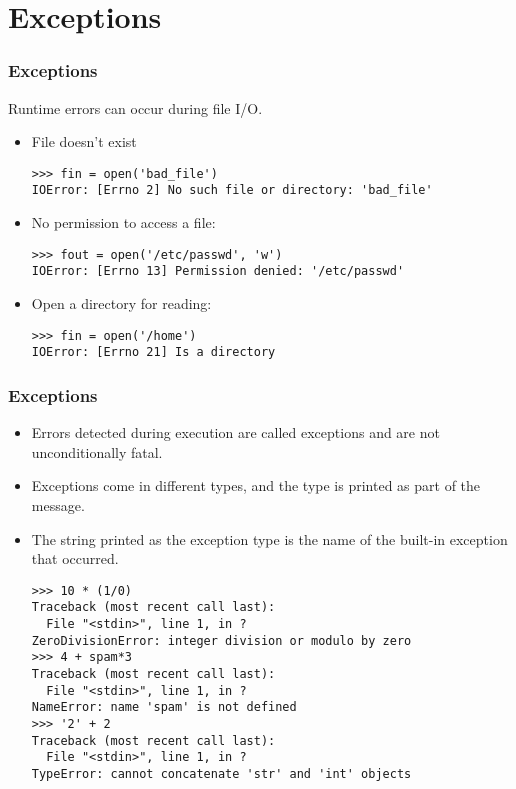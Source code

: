 \documentclass[handout]{beamer}
\newcommand{\beforeverb}{\footnotesize}
\newcommand{\afterverb}{\normalsize}
\begin{document}
\section[Exceptions]{Exceptions}
\begin{frame}[fragile]
\frametitle{Exceptions}
 \alert{Runtime errors} can occur during file I/O.
\begin{itemize}
\item  File doesn't exist
\beforeverb
\begin{verbatim}
>>> fin = open('bad_file')
IOError: [Errno 2] No such file or directory: 'bad_file'
\end{verbatim}
\afterverb
%
\item No permission to access a file:

\beforeverb
\begin{verbatim}
>>> fout = open('/etc/passwd', 'w')
IOError: [Errno 13] Permission denied: '/etc/passwd'
\end{verbatim}
\afterverb
%
\item  Open a directory for reading:
\beforeverb
\begin{verbatim}
>>> fin = open('/home')
IOError: [Errno 21] Is a directory
\end{verbatim}
\afterverb
\end{itemize}
\end{frame}

\begin{frame}[fragile]
\frametitle{Exceptions}
\begin{itemize}
\item Errors detected during execution are called \alert{exceptions} and are not unconditionally fatal.
\item Exceptions come in different \alert{types}, and the type is printed as part of the message. 
\item The string printed as the exception type is the name of the built-in exception that occurred.
\scriptsize
\begin{verbatim}
>>> 10 * (1/0)
Traceback (most recent call last):
  File "<stdin>", line 1, in ?
ZeroDivisionError: integer division or modulo by zero
>>> 4 + spam*3
Traceback (most recent call last):
  File "<stdin>", line 1, in ?
NameError: name 'spam' is not defined
>>> '2' + 2
Traceback (most recent call last):
  File "<stdin>", line 1, in ?
TypeError: cannot concatenate 'str' and 'int' objects
\end{verbatim}
\afterverb
\end{itemize}
\end{frame}
\end{document}
